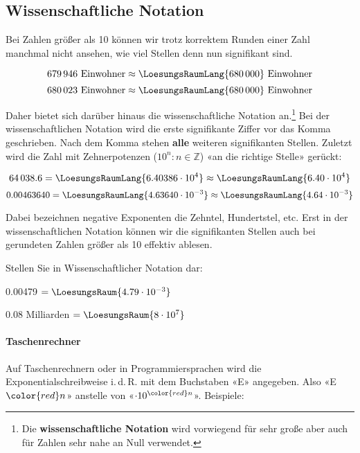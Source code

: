 
\subsection{Wissenschaftliche Notation}\label{wissenschaftlicheNotation}
Bei Zahlen größer als 10 können wir trotz korrektem Runden einer Zahl manchmal nicht ansehen, wie viel Stellen denn nun signifikant sind.

$$ 679\,946 \text{\ Einwohner} \approx  \LoesungsRaumLang{680\,000} \text{\ Einwohner}$$
$$ 680\,023 \text{\ Einwohner} \approx  \LoesungsRaumLang{680\,000} \text{\ Einwohner}$$

Daher bietet sich darüber hinaus die wissenschaftliche Notation an.\footnote{Die
\textbf{wissenschaftliche Notation} wird vorwiegend für sehr große
aber auch für Zahlen sehr nahe an Null verwendet.}
Bei der wissenschaftlichen Notation wird die erste signifikante Ziffer
vor das Komma geschrieben. Nach dem Komma stehen \textbf{alle} weiteren signifikanten Stellen.
Zuletzt wird die Zahl mit Zehnerpotenzen
($10^{n}: n \in \mathbb{Z}$) «an die richtige Stelle» gerückt:

$$64\,038.6  = \LoesungsRaumLang{6.40386 \cdot 10^{ 4}} \approx \LoesungsRaumLang{6.40 \cdot 10^{ 4}}$$
$$0.00463640 = \LoesungsRaumLang{4.63640 \cdot 10^{-3}} \approx \LoesungsRaumLang{4.64 \cdot 10^{-3}}$$

Dabei bezeichnen negative Exponenten die Zehntel, Hundertstel, etc.
Erst in der wissenschaftlichen Notation können wir die signifikanten Stellen auch bei gerundeten Zahlen größer als 10 effektiv ablesen.


Stellen Sie in Wissenschaftlicher Notation dar:

0.00479 $= \LoesungsRaum{4.79 \cdot{}10^{-3}}$

0.08 Milliarden $= \LoesungsRaum{8\cdot{}10^7}$



\newpage

\paragraph{Taschenrechner} Auf Taschenrechnern oder in
Programmiersprachen wird die Exponentialschreibweise i.\,d.\,R. mit dem
Buchstaben «E» angegeben. Also «E$\color{red}n$» anstelle von «$\cdot10^{\color{red}n}$». Beispiele:

